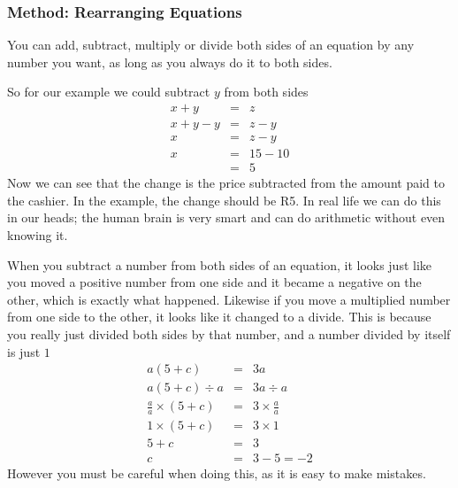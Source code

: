 \documentclass[10pt,a4paper,titlepage,twoside,openright]{report}
\begin{document}

\subsubsection{Method: Rearranging Equations}{

You can add, subtract, multiply or divide both sides of an equation by any
number you want, as long as you always do it to both sides.} 

So for our example we could subtract $y$ from both sides
\begin{eqnarray}
  \label{eq:mfoundation:alg:r:change}
  x+y&=&z \\ \nonumber
  x+y-y&=&z-y\\ \nonumber
  x&=&z-y\\ \nonumber
  x&=&15-10\\  \nonumber
	&=&5
\end{eqnarray}
Now we can see that the change is the price subtracted from the amount paid
to the cashier. In the example, the change should be R5. In real life we
can do this in our heads; the human brain is very smart and can do arithmetic
without even knowing it.

When you subtract a number from both sides of an equation, it looks just like
you moved a positive number from one side and it became a negative on the other,
which is exactly what happened. Likewise if you move a multiplied number from
one side to the other, it looks like it changed to a divide. This is because you
really just divided both sides by that number, and a number divided by itself is
just $1$
\begin{eqnarray}
  \label{eq:mfoundation:alg:r:mult}
  a(5+c)&=&3a\\ \nonumber
  a(5+c)\div a&=&3a\div a\\ \nonumber
  \frac{a}{a} \times (5+c)&=&3\times \frac{a}{a}\\ \nonumber
  1\times(5+c)&=&3\times 1\\ \nonumber
  5+c&=& 3\\ \nonumber
  c&=&3-5=-2
\end{eqnarray}
However you must be careful when doing this, as it is easy to make mistakes.
\end{document}
